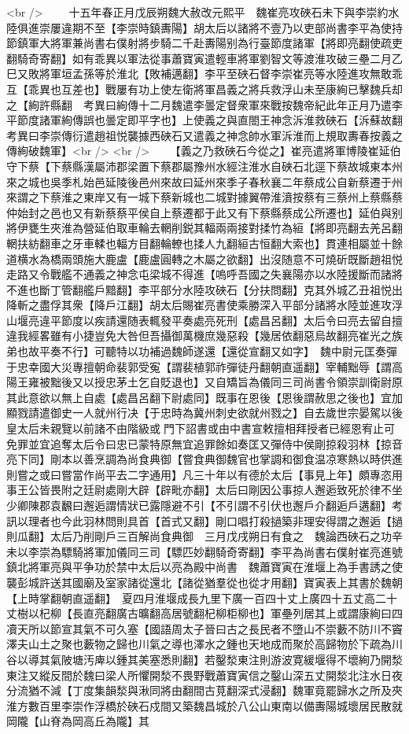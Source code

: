 <br />
　　十五年春正月戊辰朔魏大赦改元熙平　魏崔亮攻硤石未下與李崇約水陸俱進崇屢違期不至【李崇時鎮夀陽】胡太后以諸將不壹乃以吏部尚書李平為使持節鎮軍大將軍兼尚書右僕射將步騎二千赴夀陽别為行臺節度諸軍【將即亮翻使疏吏翻騎奇寄翻】如有乖異以軍法從事蕭寶寅遣輕車將軍劉智文等渡淮攻破三壘二月乙巳又敗將軍垣孟孫等於淮北【敗補邁翻】李平至硤石督李崇崔亮等水陸進攻無敢乖互【乖異也互差也】戰屢有功上使左衛將軍昌義之將兵救浮山未至康絢已擊魏兵却之【絢許縣翻　考異曰絢傳十二月魏遣李曇定督衆軍來戰按魏帝紀此年正月乃遣李平節度諸軍絢傳誤也曇定即平字也】上使義之與直閤王神念泝淮救硤石【泝蘇故翻考異曰李崇傳衍遣趙祖悦襲據西硤石又遣義之神念帥水軍泝淮而上規取夀春按義之傳絢破魏軍】<br />
<br />
　　【義之乃救硤石今從之】崔亮遣將軍博陵崔延伯守下蔡【下蔡縣漢屬沛郡梁置下蔡郡屬豫州水經注淮水自硤石北逕下蔡故城東本州來之城也吳季札始邑延陵後邑州來故曰延州來季子春秋襄二年蔡成公自新蔡遷于州來謂之下蔡淮之東岸又有一城下蔡新城也二城對據翼帶淮濆按蔡有三蔡州上蔡縣蔡仲始封之邑也又有新蔡蔡平侯自上蔡遷都于此又有下蔡縣蔡成公所遷也】延伯與别將伊甕生夾淮為營延伯取車輪去輞削鋭其輻兩兩接對揉竹為絙【將即亮翻去羌呂翻輞扶紡翻車之牙車輮也輻方目翻輪轑也揉人九翻絙古恒翻大索也】貫連相屬並十餘道横水為橋兩頭施大鹿盧【鹿盧圓轉之木屬之欲翻】出沒随意不可燒斫既斷趙祖悦走路又令戰艦不通義之神念屯梁城不得進【嗚呼吾國之失襄陽亦以水陸援斷而諸將不進也斷丁管翻艦戶黯翻】李平部分水陸攻硤石【分扶問翻】克其外城乙丑祖悦出降斬之盡俘其衆【降戶江翻】胡太后賜崔亮書使乘勝深入平部分諸將水陸並進攻浮山堰亮違平節度以疾請還随表輒發平奏處亮死刑【處昌呂翻】太后令曰亮去留自擅違我經畧雖有小捷豈免大咎但吾攝御萬機庶幾惡殺【幾居依翻惡烏故翻亮崔光之族弟也故平奏不行】可聽特以功補過魏師遂還【還從宣翻又如字】　魏中尉元匡奏彈于忠幸國大災專擅朝命裴郭受寃【謂裴植郭祚彈徒丹翻朝直遥翻】宰輔黜辱【謂高陽王雍被黜後又以授忠茅土乞自貶退也】又自矯旨為儀同三司尚書令領崇訓衛尉原其此意欲以無上自處【處昌呂翻下尉處同】既事在恩後【恩後謂赦思之後也】宜加顯戮請遣御史一人就州行决【于忠時為冀州刺史欲就州戮之】自去歲世宗晏駕以後皇太后未親覽以前諸不由階級或門下詔書或由中書宣敕擅相拜授者已經恩宥止可免罪並宜追奪太后令曰忠已蒙特原無宜追罪餘如奏匡又彈侍中侯剛掠殺羽林【掠音亮下同】剛本以善烹調為尚食典御【嘗食典御魏官也掌調和御食温凉寒熱以時供進則嘗之或曰嘗當作尚平去二字通用】凡三十年以有德於太后【事見上年】頗專恣用事王公皆畏附之廷尉處剛大辟【辟毗亦翻】太后曰剛因公事掠人邂逅致死於律不坐少卿陳郡袁飜曰邂逅謂情狀已露隱避不引【不引謂不引伏也邂戶介翻逅戶遘翻】考訊以理者也今此羽林問則具首【首式又翻】剛口唱打殺撾築非理安得謂之邂逅【撾則瓜翻】太后乃削剛戶三百解尚食典御　三月戊戌朔日有食之　魏論西硤石之功辛未以李崇為驃騎將軍加儀同三司【驃匹妙翻騎奇寄翻】李平為尚書右僕射崔亮進號鎮北將軍亮與平争功於禁中太后以亮為殿中尚書　魏蕭寶寅在淮堰上為手書誘之使襲彭城許送其國廟及室家諸從還北【諸從猶羣從也從才用翻】寶寅表上其書於魏朝【上時掌翻朝直遥翻】　夏四月淮堰成長九里下廣一百四十丈上廣四十五丈高二十丈樹以杞柳【長直亮翻廣古曠翻高居號翻杞柳柜柳也】軍壘列居其上或謂康絢曰四凟天所以節宣其氣不可久塞【國語周太子晉曰古之長民者不墮山不崇藪不防川不竇澤夫山土之聚也藪物之歸也川氣之導也澤水之鍾也天地成而聚於高歸物於下疏為川谷以導其氣陂塘汚庳以鍾其美塞悉則翻】若鑿湬東注則游波寛緩堰得不壞絢乃開湬東注又縱反間於魏曰梁人所懼開湬不畏野戰蕭寶寅信之鑿山深五丈開湬北注水日夜分流猶不減【丁度集韻湬與湫同將由翻間古莧翻深式浸翻】魏軍竟罷歸水之所及夾淮方數百里李崇作浮橋於硤石戍間又築魏昌城於八公山東南以備夀陽城壞居民散就岡隴【山脊為岡高丘為隴】其